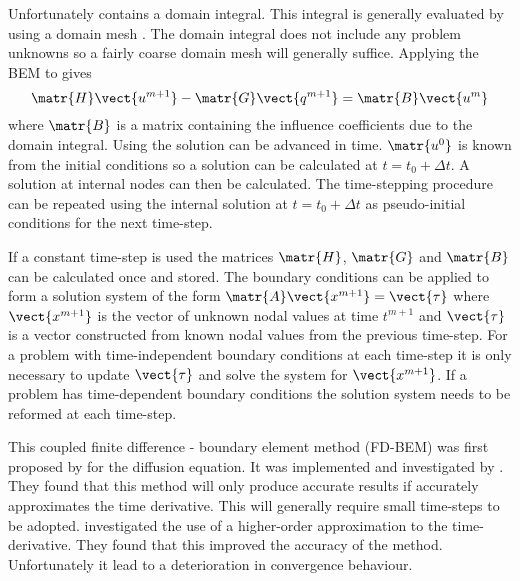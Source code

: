 Unfortunately  contains a domain integral.  This integral is
generally evaluated by using a domain mesh \citep{brebbia:1984}.  The domain
integral does not include any problem unknowns so a fairly coarse domain
mesh will generally suffice. Applying the BEM to  gives
\begin{equation}
\matr{H} \vect{u^{m+1}} - \matr{G} \vect{q^{m+1}} = \matr{B} \vect{u^{m}}
\label{eq:fdbemsys}
\end{equation}
where $\matr{B}$ is a matrix containing the influence coefficients due to the
domain integral.  Using  the solution
can be advanced in time.  $\matr{u^{0}}$ is known from the initial
conditions so a solution can be calculated at $t = t_{0} + \Delta t$.  A
solution at internal nodes can then be calculated.  The time-stepping
procedure can be repeated using the internal solution at  $t = t_{0} +
\Delta t$ as pseudo-initial conditions for the next time-step.  

If a constant time-step is used the matrices $\matr{H}$, $\matr{G}$ and
$\matr{B}$ can be calculated once and stored. The boundary conditions can be
applied to form a solution system of the form $\matr{A} \vect{x^{m+1}} =
\vect{\tau}$ where $\vect{x^{m+1}}$ is the vector of unknown nodal values
at time $t^{m+1}$ and $\vect{\tau}$ is a vector constructed from known
nodal values from the previous time-step.  For a problem with
time-independent boundary conditions at each time-step it is only necessary
to update $\vect{\tau}$ and solve the system for $\vect{x^{m+1}}$.  If a
problem has time-dependent boundary conditions the solution system needs to
be reformed at each time-step.

This coupled finite difference - boundary element method (FD-BEM) was first
proposed by \citet{walker:1980} for the diffusion equation. It was
implemented and investigated by \citet{curran:1980}.  They found that
this method will only produce accurate results if 
accurately approximates the time derivative.  This will generally require
small time-steps to be adopted.   investigated the use
of a higher-order approximation to the time-derivative.  They found that
this improved the accuracy of the method.  Unfortunately it lead to a
deterioration in convergence behaviour.


